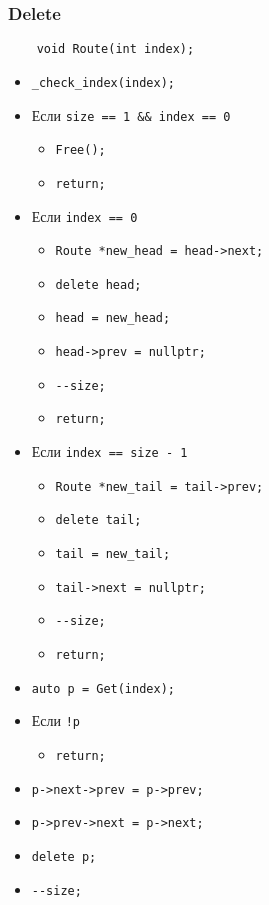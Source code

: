 \subsubsection{Delete}

\begin{lstlisting}
    void Route(int index);
\end{lstlisting}

\begin{itemize}
    \item \verb|_check_index(index);|
    \item Если \verb|size == 1 && index == 0|
        \begin{itemize}
            \item \verb|Free();|
            \item \verb|return;|
        \end{itemize}
    \item Если \verb|index == 0|
        \begin{itemize}
            \item \verb|Route *new_head = head->next;|
            \item \verb|delete head;|
            \item \verb|head = new_head;|
            \item \verb|head->prev = nullptr;|
            \item \verb|--size;|
            \item \verb|return;|
        \end{itemize}
    \item Если \verb|index == size - 1|
        \begin{itemize}
            \item \verb|Route *new_tail = tail->prev;|
            \item \verb|delete tail;|
            \item \verb|tail = new_tail;|
            \item \verb|tail->next = nullptr;|
            \item \verb|--size;|
            \item \verb|return;|
        \end{itemize}
    \item \verb|auto p = Get(index);|
    \item Если \verb|!p|
        \begin{itemize}
            \item \verb|return;|
        \end{itemize}
    \item \verb|p->next->prev = p->prev;|
    \item \verb|p->prev->next = p->next;|
    \item \verb|delete p;|
    \item \verb|--size;|
\end{itemize}

